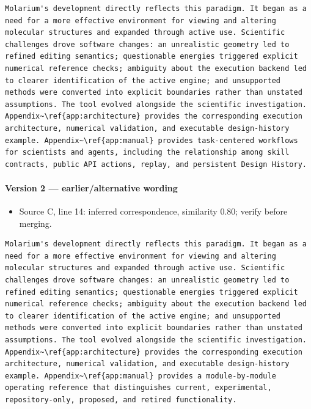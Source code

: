 \documentclass[11pt]{article}
\begin{document}
\begin{lstlisting}
Molarium's development directly reflects this paradigm. It began as a need for a more effective environment for viewing and altering molecular structures and expanded through active use. Scientific challenges drove software changes: an unrealistic geometry led to refined editing semantics; questionable energies triggered explicit numerical reference checks; ambiguity about the execution backend led to clearer identification of the active engine; and unsupported methods were converted into explicit boundaries rather than unstated assumptions. The tool evolved alongside the scientific investigation. Appendix~\ref{app:architecture} provides the corresponding execution architecture, numerical validation, and executable design-history example. Appendix~\ref{app:manual} provides task-centered workflows for scientists and agents, including the relationship among skill contracts, public API actions, replay, and persistent Design History.
\end{lstlisting}

\paragraph{Version 2 --- earlier/alternative wording}

\begin{itemize}[leftmargin=*]
\item Source C, line 14: inferred correspondence, similarity 0.80; verify before merging.
\end{itemize}

\begin{lstlisting}
Molarium's development directly reflects this paradigm. It began as a need for a more effective environment for viewing and altering molecular structures and expanded through active use. Scientific challenges drove software changes: an unrealistic geometry led to refined editing semantics; questionable energies triggered explicit numerical reference checks; ambiguity about the execution backend led to clearer identification of the active engine; and unsupported methods were converted into explicit boundaries rather than unstated assumptions. The tool evolved alongside the scientific investigation. Appendix~\ref{app:architecture} provides the corresponding execution architecture, numerical validation, and executable design-history example. Appendix~\ref{app:manual} provides a module-by-module operating reference that distinguishes current, experimental, repository-only, proposed, and retired functionality.
\end{lstlisting}
\end{document}
